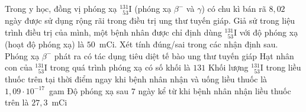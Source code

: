 	\begin{ex}%
		Trong y học, đồng vị phóng xạ ${}^{131}_{\phantom{1}53}\text{I}$ (phóng xạ $\beta^-$ và $\gamma$) có chu kì bán rã $8{,}02$ ngày được sử dụng rộng rãi trong điều trị ung thư tuyến giáp. Giả sử trong liệu trình điều trị của mình, một bệnh nhân được chỉ định dùng ${}^{131}_{\phantom{1}53}\text{I}$ với độ phóng xạ (hoạt độ phóng xạ) là $50$~mCi. Xét tính đúng/sai trong các nhận định sau.
		\choiceTFt
		{\True Phóng xạ $\beta^-$ phát ra có tác dụng tiêu diệt tế bào ung thư tuyến giáp}
		{\True Hạt nhân con của ${}^{131}_{\phantom{1}53}\text{I}$ trong quá trình phóng xạ có số khối là $131$}
		{Khối lượng ${}^{131}_{\phantom{1}53}\text{I}$ trong liều thuốc trên tại thời điểm ngay khi bệnh nhân nhận và uống liều thuốc là $1{,}09\cdot 10^{-17}$~gam}
		{\True Độ phóng xạ sau $7$ ngày kể từ khi bệnh nhân nhận liều thuốc trên là $27{,}3$~mCi}
	\end{ex}

